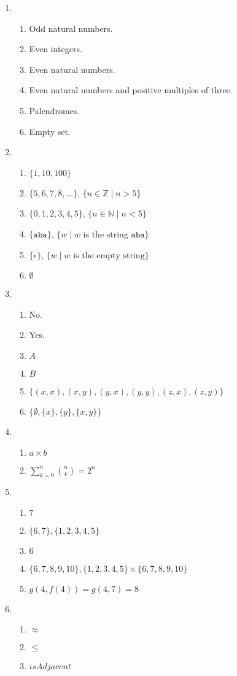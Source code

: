 \documentclass[11pt]{article}
\begin{document}
\begin{enumerate}[0.1]
  \item
  \begin{enumerate}
    \item Odd natural numbers.
    \item Even integers.
    \item Even natural numbers.
    \item Even natural numbers and positive multiples of three.
    \item Palendromes.
    \item Empty set.
  \end{enumerate}
  \item
  \begin{enumerate}
    \item $\{1,10,100\}$
    \item $\{5,6,7,8,...\}$, $\{n \in \mathbb{Z} \mid n > 5\}$
    \item $\{0,1,2,3,4,5\}$, $\{n \in \mathbb{N} \mid n < 5\}$
    \item $\{\texttt{aba}\}$, $\{w \mid w \text{ is the string } \texttt{aba}\}$
    \item $\{\epsilon\}$, $\{w \mid w \text{ is the empty string}\}$
    \item $\emptyset$
  \end{enumerate}
  \item
  \begin{enumerate}
    \item No.
    \item Yes.
    \item $A$
    \item $B$
    \item $\{(x,x),(x,y),(y,x),(y,y),(z,x),(z,y)\}$
    \item $\{\emptyset,\{x\},\{y\},\{x,y\}\}$
  \end{enumerate}
  \item
  \begin{enumerate}
    \item $a \times b$
    \item $\sum_{k=0}^n \binom{n}{k} = 2^n$
  \end{enumerate}
  \item
  \begin{enumerate}
    \item $7$
    \item $\{6,7\}, \{1,2,3,4,5\}$
    \item $6$
    \item $\{6,7,8,9,10\}, \{1,2,3,4,5\} \times \{6,7,8,9,10\}$
    \item $g(4, f(4)) = g(4, 7) = 8$
  \end{enumerate}
  \item
  \begin{enumerate}
    \item $\approx$
    \item $\leq$
    \item $isAdjacent$
  \end{enumerate}
\end{enumerate}
\end{document}
